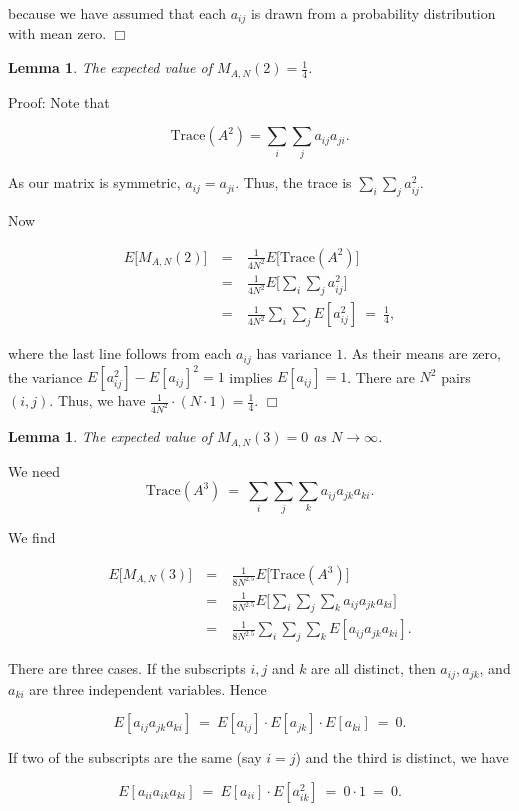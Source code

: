 \documentclass[12pt,letterpaper]{report}
\newcommand\be{\begin{equation}}
\newcommand\ee{\end{equation}}
\newcommand\bea{\begin{eqnarray}}
\newcommand\eea{\end{eqnarray}}
\newtheorem{lem}[thm]{Lemma}
\begin{document}
because we have assumed that each $a_{ij}$ is drawn from a
probability distribution with mean zero. $\Box$

\begin{lem}The expected value of $M_{A,N}(2) = \frac{1}{4}$. \end{lem}

Proof: Note that

\be \text{Trace}(A^2) = \sum_i \sum_j a_{ij}a_{ji}. \ee

As our matrix is symmetric, $a_{ij} = a_{ji}$. Thus, the trace is
$\sum_i \sum_j a_{ij}^2$.

Now

\bea E\Big[M_{A,N}(2)\Big] & \ = \ & \frac{1}{4N^2}
E\Big[\text{Trace}(A^2)\Big] \nonumber\\ & \ = \ & \frac{1}{4N^2}
E\Big[ \sum_i \sum_j a_{ij}^2 \Big] \nonumber\\ & \ = \ &
\frac{1}{4N^2} \sum_i \sum_j E[a_{ij}^2] \ = \ \frac{1}{4}, \eea

where the last line follows from each $a_{ij}$ has variance $1$.
As their means are zero, the variance $E[a_{ij}^2] - E[a_{ij}]^2 =
1$ implies $E[a_{ij}] = 1$. There are $N^2$ pairs $(i,j)$. Thus,
we have $\frac{1}{4N^2} \cdot (N \cdot 1) = \frac{1}{4}$. $\Box$

\begin{lem}The expected value of $M_{A,N}(3) = 0$ as $N \to \infty$. \end{lem}

We need \be \text{Trace}(A^3) \ = \ \sum_i \sum_j \sum_k a_{ij}
a_{jk} a_{ki}. \ee

We find

\bea E\Big[M_{A,N}(3)\Big] & \ = \ & \frac{1}{8N^{2.5}}
E\Big[\text{Trace}(A^3)\Big] \nonumber\\ & \ = \ &
\frac{1}{8N^{2.5}} E\Big[ \sum_i \sum_j \sum_k a_{ij} a_{jk}
a_{ki} \Big] \nonumber\\ & \ = \ & \frac{1}{8N^{2.5}} \sum_i
\sum_j \sum_k E[a_{ij} a_{jk} a_{ki}]. \eea

There are three cases. If the subscripts $i, j$ and $k$ are all
distinct, then $a_{ij}, a_{jk}$, and $a_{ki}$ are three
independent variables. Hence

\be E[a_{ij} a_{jk} a_{ki}] \ = \ E[a_{ij}] \cdot E[a_{jk}] \cdot
E[a_{ki}] \ = \ 0. \ee

If two of the subscripts are the same (say $i = j$) and the third
is distinct, we have

\be E[a_{ii} a_{ik} a_{ki}] \ = \ E[a_{ii}] \cdot E[a_{ik}^2] \ =
\ 0 \cdot 1 \ = \ 0. \ee
\end{document}
